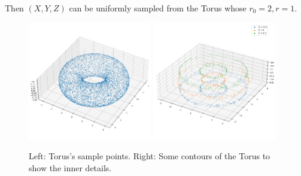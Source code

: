 \begin{homeworkProblem}
Then $(X, Y, Z)$ can be uniformly sampled from the Torus whose $r_0=2,r=1$.

\begin{figure}[ht]
    \centering
    \includegraphics[width=0.48\textwidth]{./figure/p7/d_sample.png}
    \includegraphics[width=0.48\textwidth]{./figure/p7/d_contour.png}
    \caption{Left: Torus's sample points. Right: Some contours of the Torus to show the inner details.}
\end{figure}

\end{homeworkProblem}

\newpage